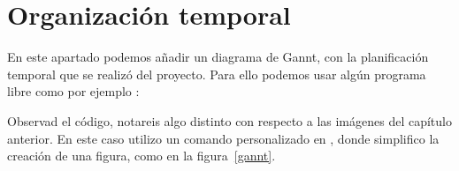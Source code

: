 

\section{Organización temporal}

En este apartado podemos añadir un diagrama de Gannt, con la
planificación temporal que se realizó del proyecto. Para ello podemos
usar algún programa libre como por ejemplo :


Observad el código, notareis algo distinto con respecto a las imágenes
del capítulo anterior. En este caso utilizo un comando personalizado
en , donde simplifico la creación de una
figura, como en la figura~\ref{gannt}. %